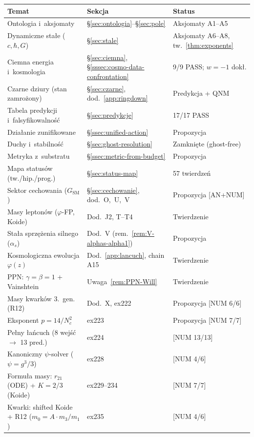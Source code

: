 \begin{center}\small
\begin{tabular}{@{}lll@{}}
\toprule
\textbf{Temat} & \textbf{Sekcja} & \textbf{Status} \\
\midrule
Ontologia i~aksjomaty & \S\ref{sec:ontologia}--\S\ref{sec:pole} & Aksjomaty A1--A5 \\
Dynamiczne sta\l{}e ($c, \hbar, G$) & \S\ref{sec:stale} & Aksjomaty A6--A8, tw.~\ref{thm:exponents} \\
Ciemna energia i~kosmologia & \S\ref{sec:ciemna}, \S\ref{sssec:cosmo-data-confrontation} & 9/9 PASS; $w = -1$ dok\l{}. \\
Czarne dziury (stan zamro\.zony) & \S\ref{sec:czarne}, dod.~\ref{app:ringdown} & Predykcja + QNM \\
Tabela predykcji i~falsyfikowalno\'s\'c & \S\ref{sec:predykcje} & 17/17 PASS \\
Dzia\l{}anie zunifikowane & \S\ref{ssec:unified-action} & Propozycja \\
Duchy i~stabilno\'s\'c & \S\ref{sec:ghost-resolution} & Zamkni\k{e}te (ghost-free) \\
Metryka z~substratu & \S\ref{ssec:metric-from-budget} & Propozycja \\
Mapa status\'ow (tw./hip./prog.) & \S\ref{sec:status-map} & 57 twierdze\'n \\
Sektor cechowania ($G_{\mathrm{SM}}$) & \S\ref{sec:cechowanie}, dod.~O,~U,~V & Propozycja [AN+NUM] \\
Masy lepton\'ow ($\varphi$-FP, Koide) & Dod.~J2, T--T4 & Twierdzenie \\
Sta\l{}a sprz\k{e}\.zenia silnego ($\alpha_s$) & Dod.~V (rem.~\ref{rem:V-alphas-alpha1}) & Propozycja \\
Kosmologiczna ewolucja $\varphi(z)$ & Dod.~\ref{app:lancuch}, chain A15 & Twierdzenie \\
PPN: $\gamma = \beta = 1$ + Vainshtein & Uwaga~\ref{rem:PPN-Will} & Twierdzenie \\
Masy kwark\'ow 3.\ gen. (R12) & Dod.~X, ex222 & Propozycja [NUM 6/6] \\
Eksponent $p = 14/N_c^2$ & ex223 & Propozycja [NUM 7/7] \\
Pe\l{}ny \l{}a\'ncuch (8 wej\'s\'c $\to$ 13 pred.) & ex224 & [NUM 13/13] \\
Kanoniczny $\psi$-solver ($\psi = g^3/3$) & ex228 & [NUM 4/6] \\
Formu\l{}a masy: $r_{21}$ (ODE) + $K=2/3$ (Koide) & ex229--234 & [NUM 7/7] \\
Kwarki: shifted Koide + R12 ($m_0 = A \cdot m_3/m_1$) & ex235 & [NUM 4/6] \\

\end{tabular}
\end{center}
